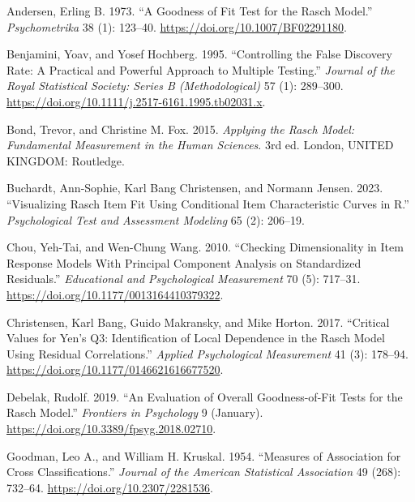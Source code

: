 \documentclass[
  letterpaper,
  DIV=11,
  numbers=noendperiod]{scrartcl}
\newlength{\cslhangindent}
\newenvironment{CSLReferences}[2] %
 {\begin{list}{}{%
  \setlength{\itemindent}{0pt}
  \setlength{\leftmargin}{0pt}
  \setlength{\parsep}{0pt}
  \ifodd #1
   \setlength{\leftmargin}{\cslhangindent}
   \setlength{\itemindent}{-1\cslhangindent}
  \fi
  \setlength{\itemsep}{#2\baselineskip}}}
 {\end{list}}
\begin{document}
\begin{CSLReferences}{1}{0}
Andersen, Erling B. 1973. {``A Goodness of Fit Test for the Rasch
Model.''} \emph{Psychometrika} 38 (1): 123--40.
\url{https://doi.org/10.1007/BF02291180}.

Benjamini, Yoav, and Yosef Hochberg. 1995. {``Controlling the {False}
{Discovery} {Rate}: {A} {Practical} and {Powerful} {Approach} to
{Multiple} {Testing}.''} \emph{Journal of the Royal Statistical Society:
Series B (Methodological)} 57 (1): 289--300.
\url{https://doi.org/10.1111/j.2517-6161.1995.tb02031.x}.

Bond, Trevor, and Christine M. Fox. 2015. \emph{Applying the {Rasch}
{Model}: {Fundamental} {Measurement} in the {Human} {Sciences}}. 3rd ed.
London, UNITED KINGDOM: Routledge.

Buchardt, Ann-Sophie, Karl Bang Christensen, and Normann Jensen. 2023.
{``Visualizing {Rasch} Item Fit Using Conditional Item Characteristic
Curves in {R}.''} \emph{Psychological Test and Assessment Modeling} 65
(2): 206--19.

Chou, Yeh-Tai, and Wen-Chung Wang. 2010. {``Checking {Dimensionality} in
{Item} {Response} {Models} {With} {Principal} {Component} {Analysis} on
{Standardized} {Residuals}.''} \emph{Educational and Psychological
Measurement} 70 (5): 717--31.
\url{https://doi.org/10.1177/0013164410379322}.

Christensen, Karl Bang, Guido Makransky, and Mike Horton. 2017.
{``Critical {Values} for {Yen}'s {Q3}: {Identification} of {Local}
{Dependence} in the {Rasch} {Model} {Using} {Residual}
{Correlations}.''} \emph{Applied Psychological Measurement} 41 (3):
178--94. \url{https://doi.org/10.1177/0146621616677520}.

Debelak, Rudolf. 2019. {``An {Evaluation} of {Overall}
{Goodness}-of-{Fit} {Tests} for the {Rasch} {Model}.''} \emph{Frontiers
in Psychology} 9 (January).
\url{https://doi.org/10.3389/fpsyg.2018.02710}.

Goodman, Leo A., and William H. Kruskal. 1954. {``Measures of
{Association} for {Cross} {Classifications}.''} \emph{Journal of the
American Statistical Association} 49 (268): 732--64.
\url{https://doi.org/10.2307/2281536}.


\end{CSLReferences}
\end{document}
